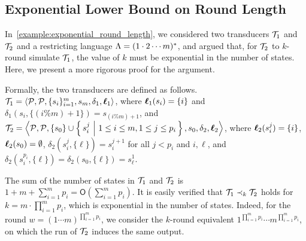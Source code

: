 \subsection{Exponential Lower Bound on Round Length}
\label{apx:exponential_round_length}

In~\autoref{example:exponential_round_length}, we considered two transducers $\mathcal{T}_1$ and $\mathcal{T}_2$ and a restricting language $\Lambda=(1\cdot 2\cdots m)^*$, and argued that, for $\mathcal{T}_2$ to $k$-round simulate $\mathcal{T}_1$, the value of $k$ must be exponential in the number of states. Here, we present a more rigorous proof for the argument.

Formally, the two transducers are defined as follows. 
$\mathcal{T}_1 = \left< \mathcal{P},\mathcal{P},\{s_i\}_{i=1}^m,s_m,\delta_1,\boldsymbol{\ell}_1\right>$, where $\boldsymbol{\ell}_1(s_i)=\{i\}$ and $\delta_1(s_i,\{(i\%m)+1\}) = s_{(i\%m)+1}$, and $\mathcal{T}_2 = \left< \mathcal{P},\mathcal{P},\{s_0\} \cup \left\{\,s_i^j\ \middle|\ 1\leq i\leq m, 1\leq j \leq p_i\,\right\},s_0,\delta_2,\boldsymbol{\ell}_2\right>$, where $\boldsymbol{\ell}_2(s_i^j)=\{i\}$, $\boldsymbol{\ell}_2(s_0)=\emptyset$, $\delta_2(s_i^j,\{\ell\}) = s_i^{j+1}$ for all $j<p_i$ and $i,\ell$, and $\delta_2(s_i^{p_i}, \{\ell\}) = \delta_2(s_0, \{\ell\}) = s_\ell^1$.

The sum of the number of states in $\mathcal{T}_1$ and $\mathcal{T}_2$ is $1+m+\sum_{i=1}^m p_i = \mathsf{O}\left(\sum_{i=1}^m p_i\right)$. It is easily verified that $\mathcal{T}_1\prec_k \mathcal{T}_2$ holds for $k = m\cdot \prod_{i=1}^m p_i$, which is exponential in the number of states. Indeed, for the round $w=(1\cdots m)^{\prod_{i=1}^mp_i}$, we consider the $k$-round equivalent $1^{\prod_{i=1}^mp_i}\cdots m^{\prod_{i=1}^mp_i}$, on which the run of $\mathcal{T}_2$ induces the same output.

